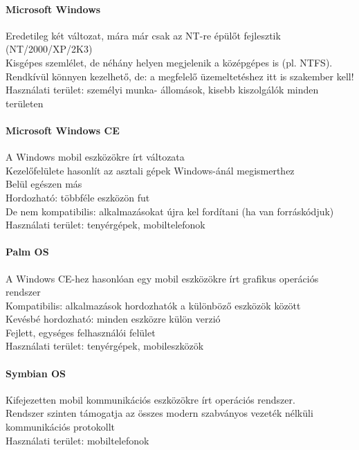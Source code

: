 \documentclass[fleqn,10pt,a4paper]{article}
\theoremstyle{magyar}
\begin{document}
  \paragraph{Microsoft Windows}
  Eredetileg két változat, mára már csak az NT-re épülőt fejlesztik (NT/2000/XP/2K3)\\
  Kisgépes szemlélet, de néhány helyen megjelenik a középgépes is (pl. NTFS).\\
  Rendkívül könnyen kezelhető, de: a megfelelő üzemeltetéshez itt is szakember kell!\\
  Használati terület: személyi munka- állomások, kisebb kiszolgálók minden területen

  \paragraph{Microsoft Windows CE}
  A Windows mobil eszközökre írt változata \\
  Kezelőfelülete hasonlít az asztali gépek Windows-ánál megismerthez \\
  Belül egészen más \\
  Hordozható: többféle eszközön fut \\
  De nem kompatibilis: alkalmazásokat újra kel fordítani (ha van forráskódjuk) \\
  Használati terület: tenyérgépek, mobiltelefonok

  \paragraph{Palm OS}
  A Windows CE-hez hasonlóan egy mobil eszközökre írt grafikus operációs rendszer\\
  Kompatibilis: alkalmazások hordozhatók a különböző eszközök között \\
  Kevésbé hordozható: minden eszközre külön verzió \\
  Fejlett, egységes felhasználói felület\\
  Használati terület: tenyérgépek, mobileszközök

  \paragraph{Symbian OS}
  Kifejezetten mobil kommunikációs eszközökre írt operációs rendszer.\\
  Rendszer szinten támogatja az összes modern szabványos vezeték nélküli kommunikációs protokollt\\
  Használati terület: mobiltelefonok
  
\end{document}

